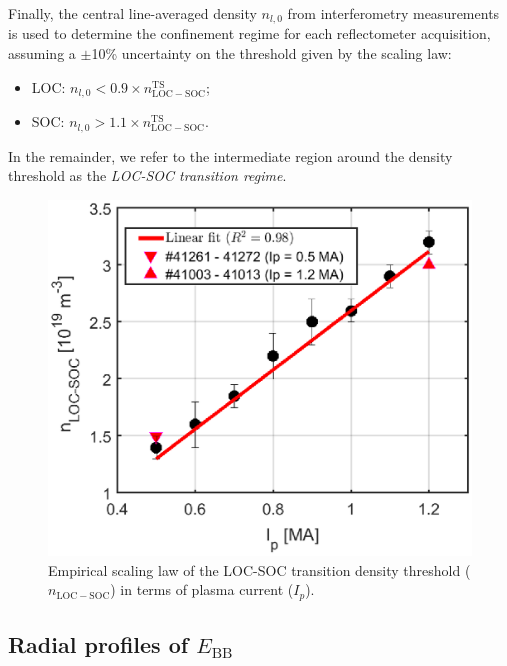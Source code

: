 Finally, the central line-averaged density $n_{l,0}$ from interferometry measurements \cite{Gil_2009_FST} is used to determine the confinement regime for each reflectometer acquisition, assuming a $\pm$10\% uncertainty on the threshold given by the scaling law:%
\begin{itemize}
  \item LOC: $n_{l,0} < 0.9 \times n_\mathrm{LOC-SOC}^\mathrm{TS}$;
  \item SOC: $n_{l,0} > 1.1 \times n_\mathrm{LOC-SOC}^\mathrm{TS}$.
\end{itemize}
\noindent In the remainder, we refer to the intermediate region around the density threshold as the \emph{LOC-SOC transition regime}.


\begin{figure}[h]
\begin{centering}
\includegraphics[scale=0.65]{fig_nLOCSOC_Ip.eps}
\par\end{centering}
\caption{Empirical scaling law of the LOC-SOC transition density threshold ($n_\mathrm{LOC-SOC}$) in terms of plasma current ($I_p$).}
\label{fig:nLOCSOC_Ip}
\end{figure}


\subsection{Radial profiles of $E_\mathrm{BB}$}

